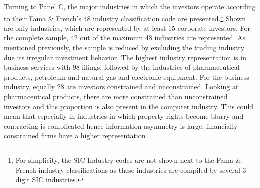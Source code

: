\documentclass[12pt]{article}
\begin{document}
Turning to Panel C, the major industries in which the investors operate according to their Fama \& French's 48 industry classification code are presented.\footnote{For simplicity, the SIC-Industry codes are not shown next to the Fama \& French industry classifications as these industries are compiled by several 3-digit SIC industries.} Shown are only industries, which are represented by at least 15 corporate investors. For the complete sample, 42 out of the maximum 48 industries are represented. As mentioned previously, the sample is reduced by excluding the trading industry due its irregular investment behavior. The highest industry representation is in business services with 98 filings, followed by the industries of pharmaceutical products, petroleum and natural gas and electronic equipment. For the business industry, equally 28 are investors constrained and unconstrained. Looking at pharmaceutical products, there are more constrained than unconstrained investors and this proportion is also present in the computer industry. This could mean that especially in industries in which property rights become blurry and contracting is complicated hence information asymmetry is large, financially constrained firms have a higher representation \citep[p.4]{Liao2014}.
\end{document}
